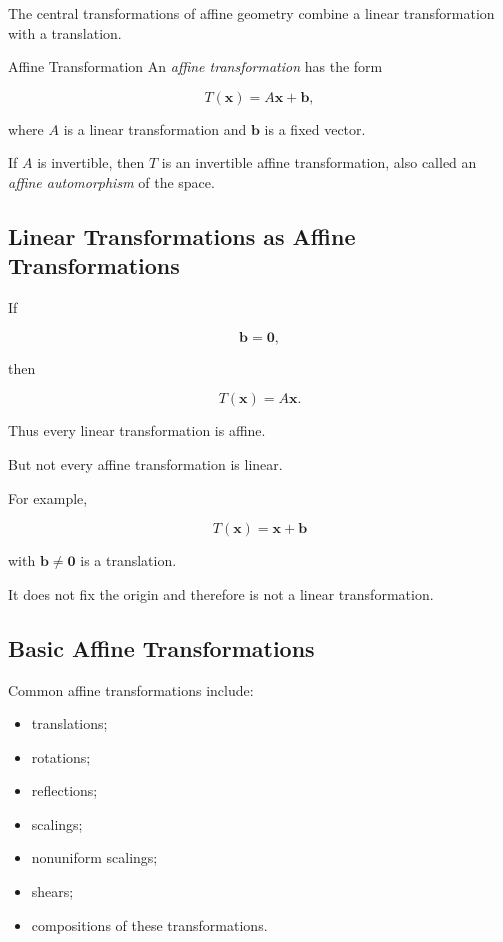 The central transformations of affine geometry combine a linear
transformation with a translation.

\begin{definitionbox}{Affine Transformation}
An \emph{affine transformation} has the form

\[
\boxed{
T(\mathbf{x})=A\mathbf{x}+\mathbf{b},
}
\]

where \(A\) is a linear transformation and \(\mathbf{b}\) is a fixed vector.
\end{definitionbox}

If \(A\) is invertible, then \(T\) is an invertible affine transformation,
also called an \emph{affine automorphism} of the space.

\subsection{Linear Transformations as Affine Transformations}
\label{subsec:linear-as-affine}

If

\[ \mathbf{b}=\mathbf{0}, \]

then

\[ T(\mathbf{x})=A\mathbf{x}. \]

Thus every linear transformation is affine.

But not every affine transformation is linear.

For example,

\[ T(\mathbf{x})=\mathbf{x}+\mathbf{b} \]

with \(\mathbf{b}\neq\mathbf{0}\) is a translation.

It does not fix the origin and therefore is not a linear transformation.

\subsection{Basic Affine Transformations}
\label{subsec:basic-affine-transformations}

Common affine transformations include:

\begin{itemize}
    \item translations;
    \item rotations;
    \item reflections;
    \item scalings;
    \item nonuniform scalings;
    \item shears;
    \item compositions of these transformations.
\end{itemize}

